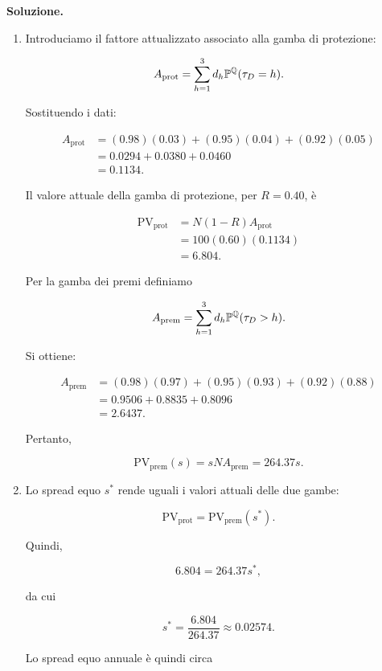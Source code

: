 \noindent
\textbf{Soluzione.}

\begin{enumerate}

\item Introduciamo il fattore attualizzato associato alla gamba di
protezione:

\[
A_{\mathrm{prot}}
=
\sum_{h=1}^{3}
d_h
\mathbb{P}^{\mathbb{Q}}(\tau_D=h).
\]

Sostituendo i dati:

\[
\begin{split}
A_{\mathrm{prot}}
&=
(0.98)(0.03)
+
(0.95)(0.04)
+
(0.92)(0.05)
\\
&=
0.0294+0.0380+0.0460
\\
&=
0.1134.
\end{split}
\]

Il valore attuale della gamba di protezione, per $R=0.40$, \`{e}

\[
\begin{split}
\mathrm{PV}_{\mathrm{prot}}
&=
N(1-R)A_{\mathrm{prot}}
\\
&=
100(0.60)(0.1134)
\\
&=
6.804.
\end{split}
\]

Per la gamba dei premi definiamo

\[
A_{\mathrm{prem}}
=
\sum_{h=1}^{3}
d_h
\mathbb{P}^{\mathbb{Q}}(\tau_D>h).
\]

Si ottiene:

\[
\begin{split}
A_{\mathrm{prem}}
&=
(0.98)(0.97)
+
(0.95)(0.93)
+
(0.92)(0.88)
\\
&=
0.9506+0.8835+0.8096
\\
&=
2.6437.
\end{split}
\]

Pertanto,

\[
\mathrm{PV}_{\mathrm{prem}}(s)
=
sNA_{\mathrm{prem}}
=
264.37s.
\]

\item Lo spread equo $s^{*}$ rende uguali i valori attuali delle due
gambe:

\[
\mathrm{PV}_{\mathrm{prot}}
=
\mathrm{PV}_{\mathrm{prem}}(s^{*}).
\]

Quindi,

\[
6.804
=
264.37s^{*},
\]

da cui

\[
s^{*}
=
\frac{6.804}{264.37}
\approx
0.02574.
\]

Lo spread equo annuale \`{e} quindi circa


\end{enumerate}
